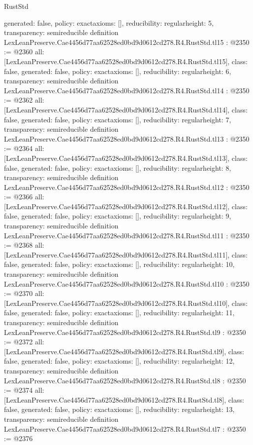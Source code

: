 \begin{lexlean}{RustStd}
\begin{coremodule}
{  generated: false,
  policy: exact{axioms: []},
  reducibility: regular{height: 5},
  transparency: semireducible
}
definition LexLeanPreserve.Cae4456d77aa62528ed0bd9d0612cd278.R4.RustStd.tl15 : @2350 := @2360 {
  all: [LexLeanPreserve.Cae4456d77aa62528ed0bd9d0612cd278.R4.RustStd.tl15],
  class: false,
  generated: false,
  policy: exact{axioms: []},
  reducibility: regular{height: 6},
  transparency: semireducible
}
definition LexLeanPreserve.Cae4456d77aa62528ed0bd9d0612cd278.R4.RustStd.tl14 : @2350 := @2362 {
  all: [LexLeanPreserve.Cae4456d77aa62528ed0bd9d0612cd278.R4.RustStd.tl14],
  class: false,
  generated: false,
  policy: exact{axioms: []},
  reducibility: regular{height: 7},
  transparency: semireducible
}
definition LexLeanPreserve.Cae4456d77aa62528ed0bd9d0612cd278.R4.RustStd.tl13 : @2350 := @2364 {
  all: [LexLeanPreserve.Cae4456d77aa62528ed0bd9d0612cd278.R4.RustStd.tl13],
  class: false,
  generated: false,
  policy: exact{axioms: []},
  reducibility: regular{height: 8},
  transparency: semireducible
}
definition LexLeanPreserve.Cae4456d77aa62528ed0bd9d0612cd278.R4.RustStd.tl12 : @2350 := @2366 {
  all: [LexLeanPreserve.Cae4456d77aa62528ed0bd9d0612cd278.R4.RustStd.tl12],
  class: false,
  generated: false,
  policy: exact{axioms: []},
  reducibility: regular{height: 9},
  transparency: semireducible
}
definition LexLeanPreserve.Cae4456d77aa62528ed0bd9d0612cd278.R4.RustStd.tl11 : @2350 := @2368 {
  all: [LexLeanPreserve.Cae4456d77aa62528ed0bd9d0612cd278.R4.RustStd.tl11],
  class: false,
  generated: false,
  policy: exact{axioms: []},
  reducibility: regular{height: 10},
  transparency: semireducible
}
definition LexLeanPreserve.Cae4456d77aa62528ed0bd9d0612cd278.R4.RustStd.tl10 : @2350 := @2370 {
  all: [LexLeanPreserve.Cae4456d77aa62528ed0bd9d0612cd278.R4.RustStd.tl10],
  class: false,
  generated: false,
  policy: exact{axioms: []},
  reducibility: regular{height: 11},
  transparency: semireducible
}
definition LexLeanPreserve.Cae4456d77aa62528ed0bd9d0612cd278.R4.RustStd.tl9 : @2350 := @2372 {
  all: [LexLeanPreserve.Cae4456d77aa62528ed0bd9d0612cd278.R4.RustStd.tl9],
  class: false,
  generated: false,
  policy: exact{axioms: []},
  reducibility: regular{height: 12},
  transparency: semireducible
}
definition LexLeanPreserve.Cae4456d77aa62528ed0bd9d0612cd278.R4.RustStd.tl8 : @2350 := @2374 {
  all: [LexLeanPreserve.Cae4456d77aa62528ed0bd9d0612cd278.R4.RustStd.tl8],
  class: false,
  generated: false,
  policy: exact{axioms: []},
  reducibility: regular{height: 13},
  transparency: semireducible
}
definition LexLeanPreserve.Cae4456d77aa62528ed0bd9d0612cd278.R4.RustStd.tl7 : @2350 := @2376 {
}
\end{coremodule}
\end{lexlean}
